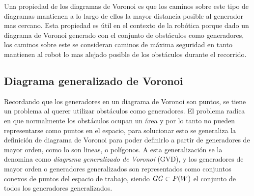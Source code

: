 Una propiedad de los diagramas de Voronoi es que los caminos sobre este tipo de diagramas mantienen a lo largo de ellos la mayor distancia posible al generador mas cercano.
Esta propiedad es útil en el contexto de la robótica porque dado un diagrama de Voronoi generado con el conjunto de obstáculos como generadores, los caminos sobre este se consideran caminos de máxima seguridad en tanto mantienen al robot lo mas alejado posible de los obstáculos durante el recorrido.


\subsection{Diagrama generalizado de Voronoi}
Recordando que los generadores en un diagrama de Voronoi son puntos, se tiene un problema al querer utilizar obstáculos como generadores. El problema radica en que normalmente los obstáculos ocupan un área y por lo tanto no pueden representarse como puntos en el espacio, para solucionar esto se generaliza la definición de diagrama de Voronoi para poder definirlo a partir de generadores de mayor orden, como lo son lineas, o polígonos. A esta generalización se la denomina como \emph{diagrama generalizado de Voronoi} (GVD), y los generadores de mayor orden o generadores generalizados son representados como conjuntos conexos de puntos del espacio de trabajo, siendo $\mathit{GG}\subset P(W)$ el conjunto de todos los generadores generalizados.


